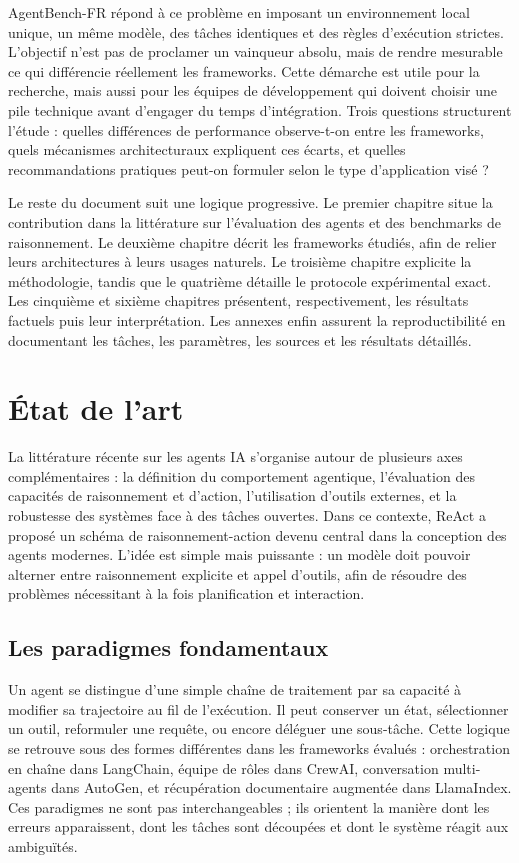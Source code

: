 \documentclass[11pt,a4paper]{article}
\begin{document}
AgentBench-FR répond à ce problème en imposant un environnement local unique, un même modèle, des tâches identiques et des règles d'exécution strictes. L'objectif n'est pas de proclamer un vainqueur absolu, mais de rendre mesurable ce qui différencie réellement les frameworks. Cette démarche est utile pour la recherche, mais aussi pour les équipes de développement qui doivent choisir une pile technique avant d'engager du temps d'intégration. Trois questions structurent l'étude : quelles différences de performance observe-t-on entre les frameworks, quels mécanismes architecturaux expliquent ces écarts, et quelles recommandations pratiques peut-on formuler selon le type d'application visé ?

Le reste du document suit une logique progressive. Le premier chapitre situe la contribution dans la littérature sur l'évaluation des agents et des benchmarks de raisonnement. Le deuxième chapitre décrit les frameworks étudiés, afin de relier leurs architectures à leurs usages naturels. Le troisième chapitre explicite la méthodologie, tandis que le quatrième détaille le protocole expérimental exact. Les cinquième et sixième chapitres présentent, respectivement, les résultats factuels puis leur interprétation. Les annexes enfin assurent la reproductibilité en documentant les tâches, les paramètres, les sources et les résultats détaillés.

\section{État de l'art}
\label{sec:etatdelart}
La littérature récente sur les agents IA s'organise autour de plusieurs axes complémentaires : la définition du comportement agentique, l'évaluation des capacités de raisonnement et d'action, l'utilisation d'outils externes, et la robustesse des systèmes face à des tâches ouvertes. Dans ce contexte, ReAct \cite{react2022} a proposé un schéma de raisonnement-action devenu central dans la conception des agents modernes. L'idée est simple mais puissante : un modèle doit pouvoir alterner entre raisonnement explicite et appel d'outils, afin de résoudre des problèmes nécessitant à la fois planification et interaction.

\subsection{Les paradigmes fondamentaux}
Un agent se distingue d'une simple chaîne de traitement par sa capacité à modifier sa trajectoire au fil de l'exécution. Il peut conserver un état, sélectionner un outil, reformuler une requête, ou encore déléguer une sous-tâche. Cette logique se retrouve sous des formes différentes dans les frameworks évalués : orchestration en chaîne dans LangChain, équipe de rôles dans CrewAI, conversation multi-agents dans AutoGen, et récupération documentaire augmentée dans LlamaIndex. Ces paradigmes ne sont pas interchangeables ; ils orientent la manière dont les erreurs apparaissent, dont les tâches sont découpées et dont le système réagit aux ambiguïtés.
\end{document}
